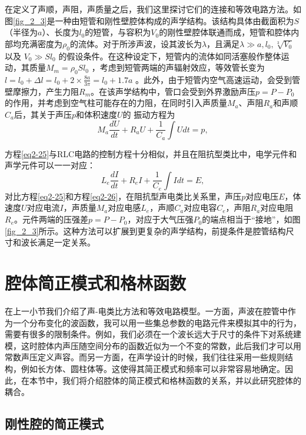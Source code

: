 在定义了声顺，声阻，声质量之后，我们这里探讨它们的连接和等效电路方法。如图\ref{fig_2_3}是一种由短管和刚性壁腔体构成的声学结构。该结构具体由截面积为$S$（半径为$a$）、长度为$l_0$的短管，与容积为$V_0$的刚性壁腔体联通而成，短管和腔体内部均充满密度为$\rho_0$的流体。对于所涉声波，设其波长为$\lambda$，且满足$\lambda \gg a, l_0, \sqrt[3]{V_0}$ 以及 $V_0 \gg Sl_0$ 的假设条件。在这种设定下，短管内的流体如同活塞般作整体运动，其质量$M_m = \rho_0Sl_0$ ，考虑到短管两端的声辐射效应，等效管长变为$l = l_0 + \Delta l = l_0 + 2\times\frac{8a}{3\pi} = l_0 + 1.7a$ 。此外，由于短管内空气高速运动，会受到管壁摩擦力，产生力阻$R_m$。在该声学结构中，管口会受到外界激励声压$p = P - P_0$的作用，并考虑到空气柱可能存在的力阻，在同时引入声质量$M_a$、声阻$R_a$和声顺$C_a$后，其关于声压$p$和体积速度$U$的 振动方程为
\begin{equation}\label{eq2-25}
  M_a\frac{dU}{dt} + R_aU + \frac{1}{C_a}\int Udt = p,
\end{equation}

方程\ref{eq2-25}与RLC电路的控制方程十分相似，并且在阻抗型类比中，电学元件和声学元件可以一一对应：
\begin{equation}\label{eq2-26}
  L_e\frac{dI}{dt} + R_eI + \frac{1}{C_e}\int Idt = E,
\end{equation}
对比方程\ref{eq2-25}和方程\ref{eq2-26}，在阻抗型声电类比关系里，声压$p$对应电压$E$，体速度$U$对应电流$I$，声质量$M_a$对应电感$L_e$，声顺$C_a$对应电容$C_e$，声阻$R_a$对应电阻$R_e$。元件两端的压强差$p = P - P_0$，对应于大气压强$P_0$的端点相当于“接地”，如图\ref{fig_2_3}所示。这种方法可以扩展到更复杂的声学结构，前提条件是腔管结构尺寸和波长满足一定关系。

 \section{腔体简正模式和格林函数}
 在上一小节我们介绍了声-电类比方法和等效电路模型。一方面，声波在腔管中作为一个分布变化的波函数，我可以用一些集总参数的电路元件来模拟其中的行为，需要有很多的限制条件。例如，我们必须在一个波长远大于尺寸的条件下对系统建模，这时腔体内声压随空间分布的函数近似为一个不变的常数，此后我们才可以用常数声压定义声容。而另一方面，在声学设计的时候，我们往往采用一些规则结构，例如长方体、圆柱体等。这使得其简正模式和频率可以非常容易地确定。因此，在本节中，我们将介绍腔体的简正模式和格林函数的关系，并以此研究腔体的耦合。

\subsection{刚性腔的简正模式}

